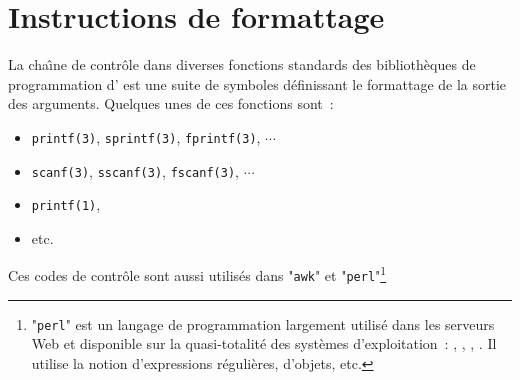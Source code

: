 %
%

\chapter{\label{ann-format}Instructions de formattage}

La cha{\^\i}ne de contr{\^o}le dans diverses fonctions standards des
biblioth{\`e}ques de programmation d'{\Unix} est une suite de symboles
d{\'e}finissant le formattage de la sortie des arguments. Quelques unes
de ces fonctions sont~:
\begin{itemize}
	\item	{}\texttt{printf(3)}, \texttt{sprintf(3)}, \texttt{fprintf(3)}, $\cdots$
	\item	\texttt{scanf(3)}, \texttt{sscanf(3)}, \texttt{fscanf(3)}, $\cdots$
	\item	\texttt{printf(1)},
	\item	etc.
\end{itemize}

Ces codes de contr{\^o}le sont aussi utilis{\'e}s dans "\texttt{awk}" et
"\texttt{perl}"\footnote{"\texttt{perl}" est un langage de
programmation largement utilis{\'e} dans les serveurs Web et disponible
sur la quasi-totalit{\'e} des syst{\`e}mes d'exploitation~: {\Unix}, {\OpenVMS},
{\Windows}, {\MacOS}. Il utilise la notion d'expressions r{\'e}guli{\`e}res,
d'objets, etc.}

